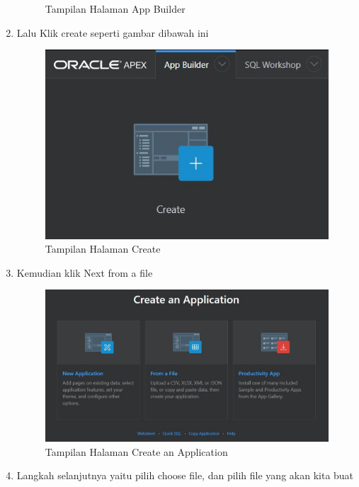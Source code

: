 \begin{enumerate}
\begin{figure}[!htbp]
\begin{center}
    \caption{Tampilan Halaman App Builder}
    \end{center}   
    \end{figure} 
\item Lalu Klik create seperti gambar dibawah ini
    \begin{figure}[!htbp]
    \begin{center}
    \includegraphics[scale=0.9]{section/ica30.JPG}
    \caption{Tampilan Halaman Create}
    \end{center}   
    \end{figure} \vspace{6cm}
\item Kemudian klik Next from a file
    \begin{figure}[!htbp]
    \begin{center}
    \includegraphics[scale=0.7]{section/ica31.JPG}
    \caption{Tampilan Halaman Create an Application}
    \end{center}   
    \end{figure} 
\item Langkah selanjutnya yaitu pilih choose file, dan pilih file yang akan kita buat

\end{enumerate}

